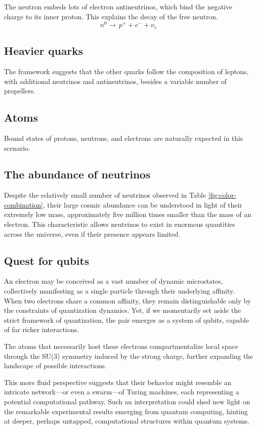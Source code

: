 \documentclass[12pt,english]{article}
\begin{document}
The neutron embeds lots of electron antineutrinos, which bind the negative charge to its inner proton. This explains the decay of the free neutron.
\[
n^0\rightarrow\,p^{+}+e^{-}+\nu_e
\]

\subsection{Heavier quarks}
The framework suggests that the other quarks follow the composition of leptons, with additional neutrinos and antineutrinos, besides a variable number of propellers.

\subsection{Atoms}
Bound states of protons, neutrons, and electrons are naturally expected in this scenario.

\subsection{The abundance of neutrinos}

Despite the relatively small number of neutrinos observed in Table \ref{fig:color-combination}, their large cosmic abundance can be understood in light of their extremely low mass, approximately five million times smaller than the mass of an electron. This characteristic allows neutrinos to exist in enormous quantities across the universe, even if their presence appears limited.

\subsection{Quest for qubits}

An electron may be conceived as a vast number of dynamic microstates, collectively manifesting as a single particle through their underlying affinity. When two electrons share a common affinity, they remain distinguishable only by the constraints of quantization dynamics. Yet, if we momentarily set aside the strict framework of quantization, the pair emerges as a system of qubits, capable of far richer interactions.

The atoms that necessarily host these electrons compartmentalize local space through the SU(3) symmetry induced by the strong charge, further expanding the landscape of possible interactions.

This more fluid perspective suggests that their behavior might resemble an intricate network—or even a swarm—of Turing machines, each representing a potential computational pathway. Such an interpretation could shed new light on the remarkable experimental results emerging from quantum computing, hinting at deeper, perhaps untapped, computational structures within quantum systems.
\end{document}
